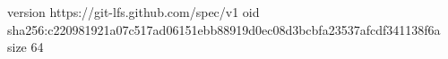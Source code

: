 version https://git-lfs.github.com/spec/v1
oid sha256:c220981921a07c517ad06151ebb88919d0ec08d3bcbfa23537afcdf341138f6a
size 64
